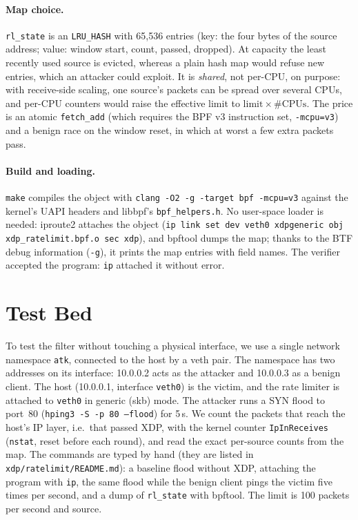

\paragraph{Map choice.} \texttt{rl\_state} is an \texttt{LRU\_HASH} with 65,536 entries (key: the four bytes of the source address; value: window start, count, passed, dropped). At capacity the least recently used source is evicted, whereas a plain hash map would refuse new entries, which an attacker could exploit. It is \emph{shared}, not per-CPU, on purpose: with receive-side scaling, one source's packets can be spread over several CPUs, and per-CPU counters would raise the effective limit to $\mathrm{limit} \times \#\mathrm{CPUs}$. The price is an atomic \texttt{fetch\_add} (which requires the BPF v3 instruction set, \texttt{-mcpu=v3}) and a benign race on the window reset, in which at worst a few extra packets pass.

\paragraph{Build and loading.} \texttt{make} compiles the object with \texttt{clang -O2 -g -target bpf -mcpu=v3} against the kernel's UAPI headers and libbpf's \texttt{bpf\_helpers.h}. No user-space loader is needed: iproute2 attaches the object (\texttt{ip link set dev veth0 xdpgeneric obj xdp\_ratelimit.bpf.o sec xdp}), and bpftool dumps the map; thanks to the BTF debug information (\texttt{-g}), it prints the map entries with field names. The verifier accepted the program: \texttt{ip} attached it without error.

\section{Test Bed}\label{sec:t4-demo}
To test the filter without touching a physical interface, we use a single network namespace \texttt{atk}, connected to the host by a veth pair. The namespace has two addresses on its interface: 10.0.0.2 acts as the attacker and 10.0.0.3 as a benign client. The host (10.0.0.1, interface \texttt{veth0}) is the victim, and the rate limiter is attached to \texttt{veth0} in generic (skb) mode. The attacker runs a SYN flood to port~80 (\texttt{hping3 -S -p 80 --flood}) for 5\,s. We count the packets that reach the host's IP layer, i.e.\ that passed XDP, with the kernel counter \texttt{IpInReceives} (\texttt{nstat}, reset before each round), and read the exact per-source counts from the map. The commands are typed by hand (they are listed in \texttt{xdp/ratelimit/README.md}): a baseline flood without XDP, attaching the program with \texttt{ip}, the same flood while the benign client pings the victim five times per second, and a dump of \texttt{rl\_state} with bpftool. The limit is 100 packets per second and source.

